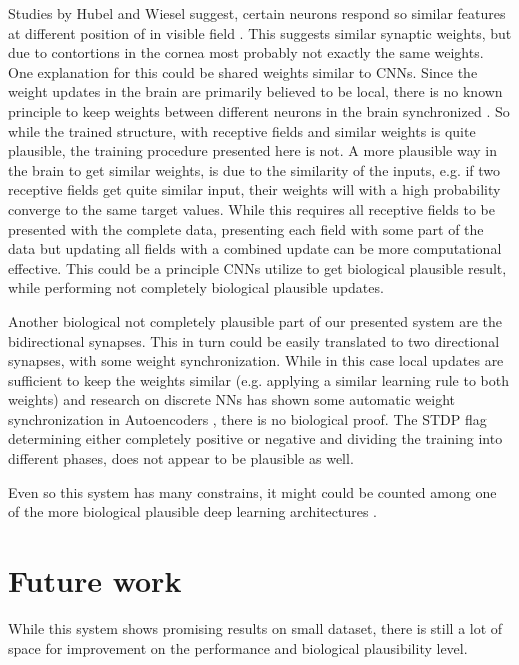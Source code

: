 Studies by Hubel and Wiesel suggest, certain neurons respond so similar features at different position of in visible field \cite{Hubel1959}.
This suggests similar synaptic weights, but due to contortions in the cornea most probably not exactly the same weights. 
One explanation for this could be shared weights similar to CNNs. 
Since the weight updates in the brain are primarily believed to be local, there is no known principle to keep weights between different neurons in the brain synchronized \cite{DBLP:journals/corr/ScellierB16}.
So while the trained structure, with receptive fields and similar weights is quite plausible, the training procedure presented here is not.
A more plausible way in the brain to get similar weights, is due to the similarity of the inputs, e.g. if two receptive fields get quite similar input, their weights will with a high probability converge to the same target values.  
While this requires all receptive fields to be presented with the complete data, presenting each field with some part of the data but updating all fields with a combined update can be more computational effective. 
This could be a principle CNNs utilize to get biological plausible result, while performing not completely biological plausible updates.

Another biological not completely plausible part of our presented system are the bidirectional synapses.
This in turn could be easily translated to two directional synapses, with some weight synchronization. 
While in this case local updates are sufficient to keep the weights similar (e.g. applying a similar learning rule to both weights) and research on discrete NNs has shown some automatic weight synchronization in Autoencoders \cite{vincent2010stacked}, there is no biological proof.
The STDP flag determining either completely positive or negative and dividing the training into different phases, does not appear to be plausible as well.

Even so this system has many constrains, it might could be counted among one of the more biological plausible deep learning architectures \cite{bengio2015towards}.     

\section{Future work} \label{c:future}

While this system shows promising results on small dataset, there is still a lot of space for improvement on the performance and biological plausibility level.

